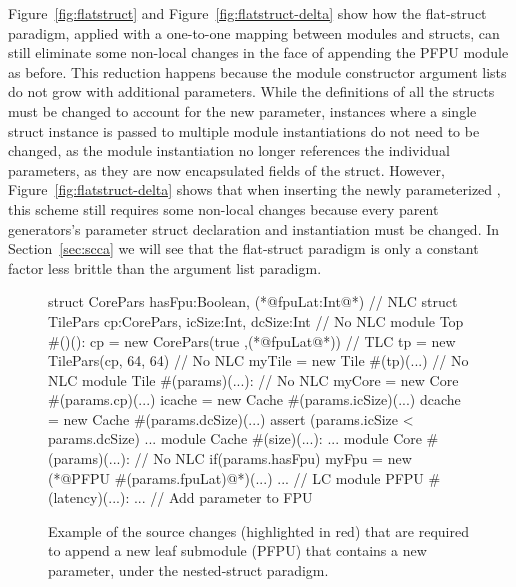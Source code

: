 Figure~\ref{fig:flatstruct} and Figure~\ref{fig:flatstruct-delta} show how the flat-struct paradigm,
applied with a one-to-one mapping between modules and structs,
can still eliminate some non-local changes in the face of appending the PFPU module as before.
This reduction happens because the module constructor argument lists do not grow with additional parameters.
While the definitions of all the structs must be changed to account for the new parameter,
instances where a single struct instance is passed to multiple module instantiations do not need to be changed,
as the module instantiation no longer references the individual parameters, as they are now encapsulated fields of the struct.
However, Figure~\ref{fig:flatstruct-delta} shows that when inserting the newly parameterized ,
this scheme still requires some non-local changes because every parent generators's parameter struct declaration and instantiation must be changed.
In Section~\ref{sec:scca} we will see that the flat-struct paradigm is only a constant factor less brittle than the argument list paradigm.

\begin{figure}
\centering
\begin{phdl}
struct CorePars {hasFpu:Boolean, (*@\textcolor[rgb]{1,0,0}{fpuLat:Int}@*)}                     // NLC
struct TilePars {cp:CorePars, icSize:Int, dcSize:Int}            // No NLC
module Top #()():
  cp = new CorePars(true ,(*@\textcolor[rgb]{1,0,0}{fpuLat}@*))                                // TLC
  tp = new TilePars(cp, 64, 64)                                  // No NLC
  myTile = new Tile #(tp)(...)                                   // No NLC
module Tile #(params)(...):                                      // No NLC
  myCore = new Core  #(params.cp)(...)                                                        
  icache = new Cache #(params.icSize)(...)
  dcache = new Cache #(params.dcSize)(...)
  assert (params.icSize < params.dcSize) ...
module Cache #(size)(...): ...
module Core #(params)(...):                                     // No NLC
  if(params.hasFpu) myFpu = new (*@\textcolor[rgb]{1,0,0}{PFPU \#(params.fpuLat)}@*)(...) ...   // LC
module PFPU #(latency)(...): ...     // Add parameter to FPU 
\end{phdl} 
\caption{Example of the source changes (highlighted in red) that are required to append a new leaf submodule (PFPU) that contains a new parameter,
under the nested-struct paradigm.}
\label{fig:nestedstruct-append}
\end{figure}

